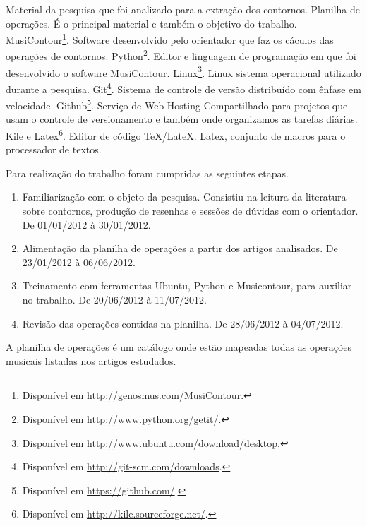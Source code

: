 \documentclass[11pt]{article}
\begin{document}
Material da pesquisa que foi analizado para a extração dos contornos.
Planilha de operações. É o principal material e também o
objetivo do trabalho.
MusiContour\footnote{Disponível em
  \url{http://genosmus.com/MusiContour}.}. Software desenvolvido pelo
orientador que faz os cáculos das operações de contornos.
Python\footnote{Disponível em
  \url{http://www.python.org/getit/}.}. Editor e linguagem de
programação em que foi desenvolvido o software MusiContour.
Linux\footnote{Disponível em
  \url{http://www.ubuntu.com/download/desktop}.}. Linux sistema
operacional utilizado durante a pesquisa.  Git\footnote{Disponível em
  \url{http://git-scm.com/downloads}.}. Sistema de controle de versão
distribuído com ênfase em velocidade.  Github\footnote{Disponível em
  \url{https://github.com/}.}. Serviço de Web Hosting Compartilhado
para projetos que usam o controle de versionamento e também onde
organizamos as tarefas diárias.  Kile e Latex\footnote{Disponível em
  \url{http://kile.sourceforge.net/}.}. Editor de código
TeX/LateX. Latex, conjunto de macros para o processador de textos.

Para realização do trabalho foram cumpridas as seguintes etapas.

\begin{enumerate}
\item Familiarização com o objeto da pesquisa. Consistiu na leitura da
  literatura sobre contornos, produção de resenhas e sessões de dúvidas
  com o orientador. De 01/01/2012 à 30/01/2012.
\item Alimentação da planilha de operações a partir dos artigos
  analisados. De 23/01/2012 à 06/06/2012.
\item Treinamento com ferramentas Ubuntu, Python e Musicontour, para
  auxiliar no trabalho. De 20/06/2012 à 11/07/2012.
\item Revisão das operações contidas na planilha. De 28/06/2012 à 04/07/2012.
\end{enumerate}

A planilha de operações é um catálogo onde estão mapeadas todas as
operações musicais listadas nos artigos estudados.
\end{document}
